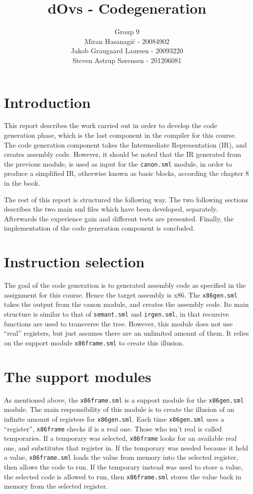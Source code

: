 \documentclass{article}
\title{dOvs - Codegeneration}
\author{
  Group 9 \\
  Miran Hasanagi\'{c} - 20084902 \\
  Jakob Graugaard Laursen - 20093220\\
  Steven Astrup S\o rensen - 201206081
}
\begin{document}
\maketitle

\section{Introduction}
This report describes the work carried out in order to develop the code generation phase, which is the last component in the compiler for this course. The code generation component takes the Intermediate Representation (IR), and creates assembly code. However, it should be noted that the IR generated from the previous module, is used as input for the \texttt{canon.sml} module, in order to produce a simplified IR, otherwise known as basic blocks, according the chapter 8 in the book.

The rest of this report is structured the following way. The two following sections describes the two main sml files which have been developed, separately. Afterwards the experience gain and different tests are presented. Finally, the implementation of the code generation component is concluded.


\section{Instruction selection}

The goal of the code generation is to generated assembly code as specified in the assignment for this course. Hence the target assembly is x86. The \texttt{x86gen.sml} takes the output from the canon module, and creates the assembly code. Its main structure is similar to that of \texttt{semant.sml} and \texttt{irgen.sml}, in that recursive functions are used to transverse the tree. However, this module does not use ``real'' registers, but just assumes there are an unlimited amount of them. It relies on the support module \texttt{x86frame.sml} to create this illusion.

\section{The support modules}
As mentioned above, the \texttt{x86frame.sml} is a support module for the \texttt{x86gen.sml} module. The main responsibility of this module is to create the illusion of an infinite amount of registers for \texttt{x86gen.sml}. Each time \texttt{x86gen.sml} uses a ``register'', \texttt{x86frame} checks if is a real one. Those who isn't real is called temporaries. If a temporary was selected, \texttt{x86frame} looks for an available real one, and substitutes that register in. If the temporary was needed because it held a value, \texttt{x86frame.sml} loads the value from memory into the selected register, then allows the code to run. If the temporary instead was used to store a value, the selected code is allowed to run, then \texttt{x86frame.sml} stores the value back in memory from the selected register. 
\end{document}
